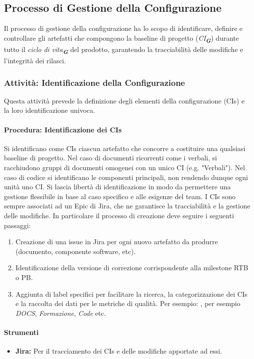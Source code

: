\documentclass[a4paper,12pt]{article}
\newcommand{\glossario}[1]{\textit{#1}\textsubscript{\textbf{\textit{\textcolor{lightblack}{G}}}}}
\begin{document}
\subsection{Processo di Gestione della Configurazione} \label{configurazione}
Il processo di gestione della configurazione ha lo scopo di identificare,
definire e controllare gli artefatti che compongono la baseline di progetto
(\glossario{CI}) durante tutto il \glossario{ciclo di vita} del prodotto,
garantendo la tracciabilità delle modifiche e l'integrità dei rilasci.

\subsubsection{Attività: Identificazione della Configurazione}
Questa attività prevede la definizione degli elementi della configurazione
(CIs) e la loro identificazione univoca.
\paragraph{Procedura: Identificazione dei CIs} \label{identificazioneCIs}
Si identificano come CIs ciascun artefatto che concorre a costituire una qualsiasi baseline di progetto.
Nel caso di documenti ricorrenti come i verbali, si racchiudono gruppi di documenti omogenei con un unico CI (e.g. "Verbali").
Nel caso di codice si identificano le componenti principali, non rendendo dunque ogni unità uno CI.
Si lascia libertà di identificazione in modo da permettere una gestione flessibile in base al caso specifico e alle esigenze del team.
I CIs sono sempre associati ad un Epic di Jira, che ne garantisce la
tracciabilità e la gestione delle modifiche. In particolare il processo di
creazione deve seguire i seguenti passaggi:
\begin{enumerate}
    \item Creazione di una issue in Jira per ogni nuovo artefatto da produrre (documento,
          componente software, etc).
    \item Identificazione della versione di correzione corrispondente alla milestone RTB
          o PB.
    \item Aggiunta di label specifici per facilitare la ricerca, la categorizzazione dei
          CIs e la raccolta dei dati per le metriche di qualità. Per esempio: , per
          esempio \textit{DOCS}, \textit{Formazione}, \textit{Code} etc.
\end{enumerate}
\paragraph{Strumenti}
\begin{itemize}
    \item \textbf{Jira:} Per il tracciamento dei CIs e delle modifiche apportate ad essi.
\end{itemize}
\end{document}
